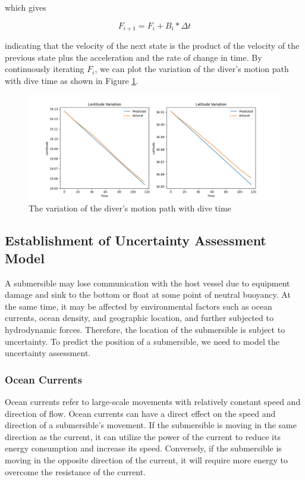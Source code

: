 \documentclass[12pt]{article}
\begin{document}
which gives

\begin{equation}
    F_{i+1}=F_{i}+B_{i}*\Delta t
\end{equation}

indicating that the velocity of the next state is the product of the velocity of the previous state plus the acceleration and the rate of change in time. By continuously iterating $F_i$, we can plot the variation of the diver's motion path with dive time as shown in Figure \ref{fig:variation}.

\begin{figure}[h!]
    \centering
    \includegraphics[width=.8\textwidth]{fig/variation.jpg}
    \caption{The variation of the diver's motion path with dive time}
    \label{fig:variation}
\end{figure}

\subsection{Establishment of Uncertainty Assessment Model}

A submersible may lose communication with the host vessel due to equipment damage and sink to the bottom or float at some point of neutral buoyancy. At the same time, it may be affected by environmental factors such as ocean currents, ocean density, and geographic location, and further subjected to hydrodynamic forces. Therefore, the location of the submersible is subject to uncertainty. To predict the position of a submersible, we need to model the uncertainty assessment.

\subsubsection{Ocean Currents}

Ocean currents refer to large-scale movements with relatively constant speed and direction of flow. \cite{0022-3670} Ocean currents can have a direct effect on the speed and direction of a submersible's movement. If the submersible is moving in the same direction as the current, it can utilize the power of the current to reduce its energy consumption and increase its speed. Conversely, if the submersible is moving in the opposite direction of the current, it will require more energy to overcome the resistance of the current.
\end{document}

